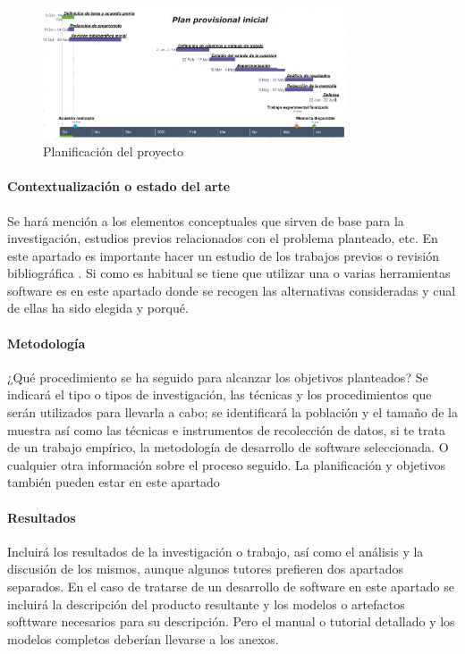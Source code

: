 \begin{figure}  
 	\begin{center}
        \includegraphics[width=0.8\textwidth]{Figures/plandef.png}
        	\end{center}
        \caption{Planificación del proyecto}
    \label{fig:plan}
\end{figure}

\paragraph{Contextualización o estado del arte}

Se hará mención a los elementos conceptuales que  sirven  de  base  para  la  investigación,  estudios  previos  relacionados  con  el problema planteado, etc. En este apartado es importante hacer un estudio de los trabajos previos o revisión bibliográfica \cite{kitchenham2009systematic,kitchenham_2013}. Si como es habitual se tiene  que utilizar una o varias herramientas software es en este apartado donde se recogen las alternativas consideradas y cual de ellas ha sido elegida  y porqué.

\paragraph{Metodología}
¿Qué procedimiento se ha seguido para alcanzar los objetivos
planteados? Se  indicará  el  tipo  o  tipos  de  investigación,  las  técnicas  y  los procedimientos  que  serán  utilizados  para  llevarla  a  cabo;  se  identificará la población  y  el  tamaño  de  la  muestra  así  como  las técnicas  e  instrumentos  de recolección de datos, si te trata de un trabajo empírico, la metodología de desarrollo de software seleccionada. O cualquier otra información sobre el proceso seguido. La planificación y objetivos también pueden estar en este apartado

 
\paragraph{Resultados}
Incluirá  los  resultados  de  la  investigación  o  trabajo,  así como el análisis y la discusión de los mismos, aunque algunos tutores prefieren dos apartados separados. En el caso de tratarse de un desarrollo de software en este apartado se incluirá la descripción del producto resultante y los modelos o artefactos softtware necesarios para su descripción. Pero el manual o tutorial detallado  y los modelos completos deberían llevarse a los anexos.


